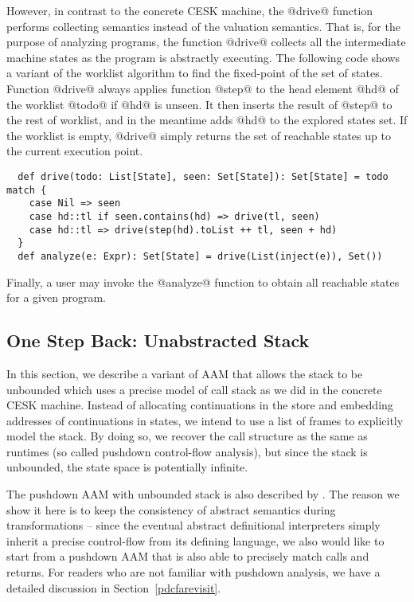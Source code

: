 \documentclass[acmsmall, review]{acmart}\settopmatter{}
\begin{document}
However, in contrast to the concrete CESK machine, the @drive@ function performs 
collecting semantics instead of the valuation semantics. That is, for the purpose of
analyzing programs, the function @drive@ collects all the intermediate machine states 
as the program is abstractly executing. The following code shows a variant of the 
worklist algorithm to find the fixed-point of the set of states.
Function @drive@ always applies function @step@ to the head element @hd@ of
the worklist @todo@ if @hd@ is unseen. It then inserts the result of @step@ to
the rest of worklist, and in the meantime adds @hd@ to the explored states set.
If the worklist is empty, @drive@ simply returns the set of reachable states
up to the current execution point.

\begin{lstlisting}
  def drive(todo: List[State], seen: Set[State]): Set[State] = todo match {
    case Nil => seen
    case hd::tl if seen.contains(hd) => drive(tl, seen)
    case hd::tl => drive(step(hd).toList ++ tl, seen + hd)
  }
  def analyze(e: Expr): Set[State] = drive(List(inject(e)), Set())
\end{lstlisting}

Finally, a user may invoke the @analyze@ function to obtain all reachable states for 
a given program.


\subsection{One Step Back: Unabstracted Stack} \label{unabs}

In this section, we describe a variant of AAM that allows the stack to be unbounded 
which uses a precise model of call stack as we did in the concrete CESK machine.
Instead of allocating continuations in the store and embedding addresses of 
continuations in states, we intend to use a list of frames to explicitly model 
the stack. By doing so, we recover the call structure as the same as runtimes
(so called pushdown control-flow analysis), but since the stack is unbounded, 
the state space is potentially infinite. 

The pushdown AAM with unbounded stack is also described by \citeauthor{van2012systematic} 
\cite{van2012systematic}. 
The reason we show it here is to keep the consistency of abstract semantics during 
transformations -- since the eventual abstract definitional interpreters simply inherit
a precise control-flow from its defining language, we also would like to start from a
pushdown AAM that is also able to precisely match calls and returns.
For readers who are not familiar with pushdown analysis, we have a detailed discussion 
in Section~\ref{pdcfarevisit}.
\end{document}
